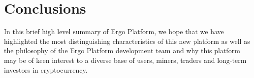 \documentclass[]{article}
\begin{document}
    \section{Conclusions}

    In this brief high level summary of Ergo Platform, we hope that we have highlighted the most
    distinguishing characteristics of this new platform as well as the philosophy of the Ergo Platform
    development team and why this platform may be of keen interest to a diverse base of users,
    miners, traders and long-term investors in cryptocurrency.

    
\end{document}
